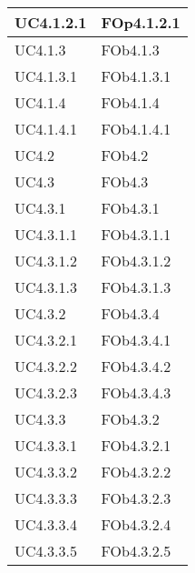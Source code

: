 \begin{longtable}{|l|p{4cm}|}
\hline
		UC4.1.2.1 & FOp4.1.2.1 \linebreak   \\
\hline
		UC4.1.3 & FOb4.1.3 \linebreak   \\
\hline
		UC4.1.3.1 & FOb4.1.3.1 \linebreak   \\
\hline
		UC4.1.4 & FOb4.1.4 \linebreak   \\
\hline
		UC4.1.4.1 & FOb4.1.4.1 \linebreak   \\
\hline
		UC4.2 & FOb4.2 \linebreak   \\
\hline
		UC4.3 & FOb4.3 \linebreak   \\
\hline
		UC4.3.1 & FOb4.3.1 \linebreak   \\
\hline
		UC4.3.1.1 & FOb4.3.1.1 \linebreak   \\
\hline
		UC4.3.1.2 & FOb4.3.1.2 \linebreak   \\
\hline
		UC4.3.1.3 & FOb4.3.1.3 \linebreak   \\
\hline
		UC4.3.2 & FOb4.3.4 \linebreak   \\
\hline
		UC4.3.2.1 & FOb4.3.4.1 \linebreak   \\
\hline
		UC4.3.2.2 & FOb4.3.4.2 \linebreak   \\
\hline
		UC4.3.2.3 & FOb4.3.4.3 \linebreak   \\
\hline
		UC4.3.3 & FOb4.3.2 \linebreak   \\
\hline
		UC4.3.3.1 & FOb4.3.2.1 \linebreak   \\
\hline
		UC4.3.3.2 & FOb4.3.2.2 \linebreak   \\
\hline
		UC4.3.3.3 & FOb4.3.2.3 \linebreak   \\
\hline
		UC4.3.3.4 & FOb4.3.2.4 \linebreak   \\
\hline
		UC4.3.3.5 & FOb4.3.2.5 \linebreak   \\

\end{longtable}
